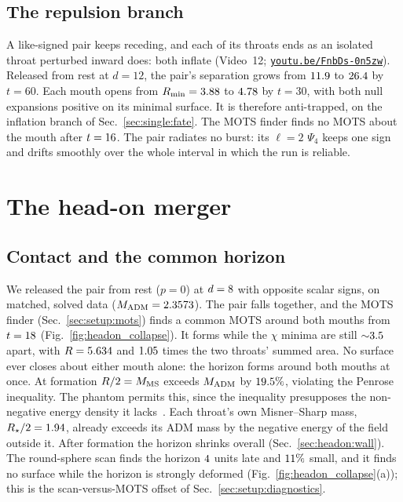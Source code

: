 \documentclass[twocolumn,floatfix,aps,prd,superscriptaddress,nofootinbib,showkeys]{revtex4-2}
\begin{document}
\subsection{The repulsion branch}
\label{sec:pair:recede}

A like-signed pair keeps receding, and each of its throats ends as an isolated throat perturbed inward does: both inflate (Video~12; \href{https://youtu.be/FnbDs-0n5zw}{\nolinkurl{youtu.be/FnbDs-0n5zw}}). Released from rest at $d=12$, the pair's separation grows from $11.9$ to $26.4$ by $t=60$. Each mouth opens from $R_{\min}=3.88$ to $4.78$ by $t=30$, with both null expansions positive on its minimal surface. It is therefore anti-trapped, on the inflation branch of Sec.~\ref{sec:single:fate}. The MOTS finder finds no MOTS about the mouth after $t=16$. The pair radiates no burst: its $\ell=2$ $\Psi_4$ keeps one sign and drifts smoothly over the whole interval in which the run is reliable.

\section{The head-on merger}
\label{sec:headon}

\subsection{Contact and the common horizon}
\label{sec:headon:contact}

We released the pair from rest ($p=0$) at $d=8$ with opposite scalar signs, on matched, solved data ($M_{\rm ADM}=2.3573$). The pair falls together, and the MOTS finder (Sec.~\ref{sec:setup:mots}) finds a common MOTS around both mouths from $t=18$ (Fig.~\ref{fig:headon_collapse}). It forms while the $\chi$ minima are still ${\sim}3.5$ apart, with $R=5.634$ and $1.05$ times the two throats' summed area. No surface ever closes about either mouth alone: the horizon forms around both mouths at once. At formation $R/2=M_{\rm MS}$ exceeds $M_{\rm ADM}$ by $19.5\%$, violating the Penrose inequality. The phantom permits this, since the inequality presupposes the non-negative energy density it lacks~\cite{huisken2001,mars2009}. Each throat's own Misner--Sharp mass, $R_\star/2=1.94$, already exceeds its ADM mass by the negative energy of the field outside it. After formation the horizon shrinks overall (Sec.~\ref{sec:headon:wall}). The round-sphere scan finds the horizon $4$ units late and $11\%$ small, and it finds no surface while the horizon is strongly deformed (Fig.~\ref{fig:headon_collapse}(a)); this is the scan-versus-MOTS offset of Sec.~\ref{sec:setup:diagnostics}.
\end{document}

